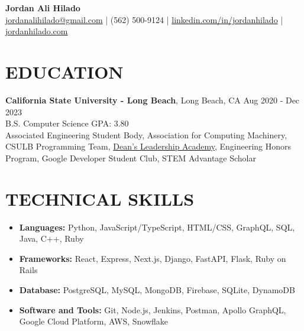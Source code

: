 \documentclass[a4paper,10pt]{extarticle}
\begin{document}
\pagestyle{empty}

\begin{center}
\textbf{\Large Jordan Ali Hilado}\\[2pt] %
\href{mailto:jordanalihilado@gmail.com}{jordanalihilado@gmail.com} | (562) 500-9124 | \href{https://www.linkedin.com/in/jordanhilado}{linkedin.com/in/jordanhilado} | \href{https://jordanhilado.com/}{jordanhilado.com} %
\end{center}

\section*{EDUCATION}
\noindent
\textbf{California State University - Long Beach}, Long Beach, CA \hfill Aug 2020 - Dec 2023\\ %
B.S. Computer Science \hfill GPA: 3.80\\ %
Associated Engineering Student Body, Association for Computing Machinery, CSULB Programming Team, \href{https://www.csulb.edu/college-of-engineering/aerospace-corporation-leadership-academy}{Dean’s Leadership Academy}, Engineering Honors Program, Google Developer Student Club, STEM Advantage Scholar %

\section*{TECHNICAL SKILLS}
\begin{itemize}
    \item \textbf{Languages:} Python, JavaScript/TypeScript, HTML/CSS, GraphQL, SQL, Java, C++, Ruby %
    \item \textbf{Frameworks:} React, Express, Next.js, Django, FastAPI, Flask, Ruby on Rails %
    \item \textbf{Database:} PostgreSQL, MySQL, MongoDB, Firebase, SQLite, DynamoDB %
    \item \textbf{Software and Tools:} Git, Node.js, Jenkins, Postman, Apollo GraphQL, Google Cloud Platform, AWS, Snowflake %
\end{itemize}

\end{document}
